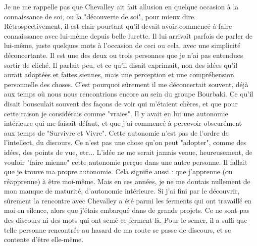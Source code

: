 Je ne me rappelle pas que Chevalley ait fait allusion en quelque occasion à la connaissance de soi, ou la "découverte de soi", pour mieux dire. Rétrospectivement, il est clair pourtant qu'il devait avoir commencé à faire connaissance avec lui-même depuis belle lurette. Il lui arrivait parfois de parler de lui-même, juste quelques mots à l'occasion de ceci ou cela, avec une simplicité déconcertante. Il est une des deux ou trois personnes que je n'ai pas entendues sortir de cliché. Il parlait peu, et ce qu'il disait exprimait, non des idées qu'il aurait adoptées et faites siennes, mais une perception et une compréhension personnelle des choses. C'est pourquoi sûrement il me déconcertait souvent, déjà aux temps où nous nous rencontrions encore au sein du groupe Bourbaki. Ce qu'il disait bousculait souvent des façons de voir qui m'étaient chères, et que pour cette raison je considérais comme "vraies". Il y avait en lui une autonomie intérieure qui me faisait défaut, et que j'ai commencé à percevoir obscurément aux temps de "Survivre et Vivre". Cette autonomie n'est pas de l'ordre de l'intellect, du discours. Ce n'est pas une chose qu'on peut "adopter", comme des idées, des points de vue, etc... L'idée ne me serait jamais venue, heureusement, de vouloir "faire mienne" cette autonomie perçue dans une autre personne. Il fallait que je trouve ma propre autonomie. Cela signifie aussi : que j'apprenne (ou réapprenne) à être moi-même. Mais en ces années, je ne me doutais nullement de mon manque de maturité, d'autonomie intérieure. Si j'ai fini par le découvrir, sûrement la rencontre avec Chevalley a été parmi les ferments qui ont travaillé en moi en silence, alors que j'étais embarqué dans de grands projets. Ce ne sont pas des discours ni des mots qui ont semé ce ferment-là. Pour le semer, il a suffi que telle personne rencontrée au hasard de ma route se passe de discours, et se contente d'être elle-même.

